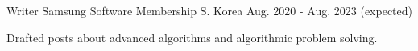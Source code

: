 

\begin{cventries}

  \cventry
    {Writer} %
    {Samsung Software Membership} %
    {S. Korea} %
    {Aug. 2020 - Aug. 2023 (expected)} %
    {
      \begin{cvitems} %
        \item {Drafted posts about advanced algorithms and algorithmic problem solving.}
      \end{cvitems}
    }

\end{cventries}
